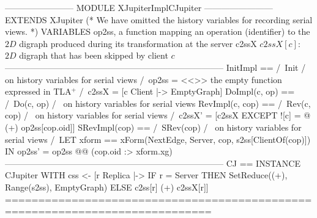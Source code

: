 \documentclass[preview, border={5pt 0pt 42pt 1pt}]{standalone}
\begin{document}
\begin{tla}
------------------------ MODULE XJupiterImplCJupiter ------------------------
EXTENDS XJupiter
(* We have omitted the history variables for recording serial views. *) 
VARIABLES op2ss, \* a function mapping an operation (identifier)
                 \* to the $2D$ digraph produced during its transformation at the server
          c2ssX  \* $c2ssX[c]$: $2D$ digraph that has been skipped by client $c$
-----------------------------------------------------------------------------
InitImpl == /\ Init 
            /\ \* on history variables for serial views
            /\ op2ss = <<>> \* the empty function expressed in TLA$^{+}$
            /\ c2ssX = [c \in Client |-> EmptyGraph]
DoImpl(c, op) == /\ Do(c, op)
                 /\ \* on history variables for serial views
RevImpl(c, cop) == /\ Rev(c, cop) 
                   /\ \* on history variables for serial views
                   /\ c2ssX' = [c2ssX EXCEPT ![c] = @ (+) op2ss[cop.oid]] 
SRevImpl(cop) == /\ SRev(cop) 
                 /\ \* on history variables for serial views
                 /\ LET xform == xForm(NextEdge, Server, cop, s2ss[ClientOf(cop)])
                    IN op2ss' = op2ss @@ (cop.oid :> xform.xg)
-----------------------------------------------------------------------------
CJ == INSTANCE CJupiter WITH css <- [r \in Replica |->
                   IF r = Server THEN SetReduce((+), Range(s2ss), EmptyGraph)
                                 ELSE c2ss[r] (+) c2ssX[r]]
=============================================================================
\end{tla}
\end{document}
